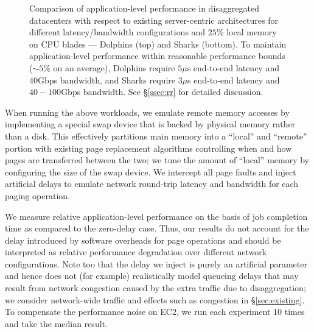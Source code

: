 %
\begin{figure}

  \centering

  \caption{\small{Comparison of application-level performance in disaggregated datacenters with respect to existing server-centric architectures for different latency/bandwidth configurations and $25\%$ local memory on CPU blades --- Dolphins (top) and Sharks (bottom). To maintain application-level performance within reasonable performance bounds ($\sim 5\%$ on an average), Dolphins require $5\mu$s end-to-end latency and $40$Gbps bandwidth, and Sharks require  $3\mu$s end-to-end latency and $40-100$Gbps bandwidth. See \S\ref{ssec:rr} for detailed discussion.}}
  \label{fig:latb}
\end{figure}
%
When running the above workloads, we emulate remote memory accesses by implementing a special swap device that is backed by physical memory rather than a disk. This effectively partitions main memory into a ``local'' and ``remote'' portion 
with existing page replacement algorithms controlling when and how pages are transferred between the two; we tune the amount of ``local'' memory by configuring the size of the swap device.
We intercept all page faults and inject artificial delays to emulate network round-trip latency and bandwidth for each paging operation. 

We measure relative application-level performance on the basis of job completion time as compared to the zero-delay case. Thus, our results do not account for the delay introduced by  software overheads for page operations 
and should be interpreted as relative performance degradation over different network configurations. %
Note too that the delay we inject is purely an artificial parameter and hence does not (for example) realistically model queueing delays that may result from network congestion caused by the extra traffic due to disaggregation; we consider network-wide traffic and effects such as congestion in \S\ref{sec:existing}.
To compensate the performance noise on EC2, we run each experiment 10 times and take the median result.



